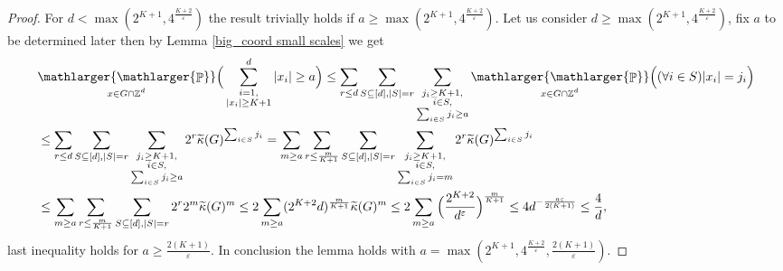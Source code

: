\documentclass[a4paper,oneside, reqno]{amsart}
\numberwithin{equation}{section}
\theoremstyle{definition}%
\theoremstyle{definition}
\theoremstyle{definition}%
\theoremstyle{definition}
\newcommand{\Pro}{\mathop{\mathbb{P}}}
\newcommand{\Z}{\mathbb{Z}}
\newcommand{\spr}[1]{\underset{_{\substack{#1}}}{\mathlarger{\mathlarger{\Pro}}}}
\begin{document}
\begin{proof}
For $d < \max(2^{K+1},4^{\frac{K+2}{\varepsilon}})$ the result trivially holds if $a  \ge \max(2^{K+1},4^{\frac{K+2}{\varepsilon}})$. 
Let us consider $d \ge \max(2^{K+1},4^{\frac{K+2}{\varepsilon}})$, fix $a$ to be determined later then by Lemma \ref{big_coord small scales} we get  
\begin{align*}
&\spr{x \in G \cap \Z^d} \Big(\sum_{\substack{i=1, \\ |x_i| \ge K+1}}^d 
|x_i| \ge a \Big)  \le \sum_{r \le d } \sum_{S \subseteq [d], |S|=r} \sum_{\substack{j_i \ge K+1,\\i \in S, \\
\sum_{i\in S} j_i \ge a}}\spr{x \in G \cap \Z^d} \Big( (\forall i \in S) |x_i| =j_i\Big) \\
&\le \sum_{r \le d } \sum_{S \subseteq [d], |S|=r} \sum_{\substack{j_i \ge K+1,\\i \in S, \\
\sum_{i\in S} j_i \ge a}} 2^r \widetilde{\kappa}(G)^{\sum_{i \in S}j_i} = \sum_{m \ge a}\sum_{r \le \frac{m}{K+1} } \sum_{S \subseteq [d], |S|=r} \sum_{\substack{j_i \ge K+1,\\i \in S, \\
\sum_{i\in S} j_i =m}} 2^r \widetilde{\kappa}(G)^{\sum_{i \in S}j_i} \\
&\le \sum_{m \ge a}\sum_{r \le \frac{m}{K+1} } \sum_{S \subseteq [d], |S|=r}  2^r 2^{m} \widetilde{\kappa}(G)^m \le 2 \sum_{m \ge a} (2^{K+2}d)^{ \frac{m}{K+1}} \widetilde{\kappa}(G)^m \le 2 \sum_{m \ge a} \Big(\frac{2^{K+2}}{d^\varepsilon} \Big)^{\frac{m}{K+1}} \le 4d ^{-\frac{a\varepsilon}{2(K+1)}} \le \frac{4}{d},
\end{align*}
last inequality holds for $a \ge \frac{2(K+1)}{\varepsilon}$.
In conclusion the lemma holds with $a=\max(2^{K+1},4^{\frac{K+2}{\varepsilon}}, \frac{2(K+1)}{\varepsilon})$.
\end{proof}
\end{document}
